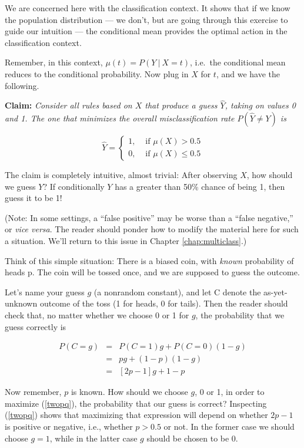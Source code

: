 We are concerned here with the classification context.  It shows that
if we know the population distribution --- we don't, but are going
through this exercise to guide our intuition --- the conditional mean
provides the optimal action in the classification context.

Remember, in this context, $\mu(t) = P(Y ~|~ X = t)$, i.e.\ the
conditional mean reduces to the conditional probability.  Now plug in
$X$ for $t$, and we have the following.

{\bf Claim:} {\it Consider all rules based on $X$ that produce a guess
$\widehat{Y}$, taking on values 0 and 1.  The one that minimizes the
overall misclassification rate $P(\widehat{Y} \neq Y)$ is}

\begin{equation}
\widehat{Y} = 
\begin{cases}
      1, & \textrm{ if } \mu(X) > 0.5 \\
      0, & \textrm{ if } \mu(X) \leq 0.5 
\end{cases}
\end{equation}

The claim is completely intuitive, almost trivial:  After observing $X$,
how should we guess $Y$?  If conditionally $Y$ has a greater than 50\%
chance of being 1, then guess it to be 1!

(Note:  In some settings, a ``false positive'' may be worse than a
``false negative,'' or {\it vice versa}.  The reader should ponder how
to modify the material here for such a situation.  We'll return to this
issue in Chapter \ref{chap:multiclass}.)

Think of this simple situation:  There is a biased coin, with
\textit{known} probability of heads p.  The coin will be tossed once,
and we are supposed to guess the outcome.

Let's name your guess $g$ (a nonrandom constant), and let C denote the
as-yet-unknown outcome of the toss (1 for heads, 0 for tails).  Then the
reader should check that, no matter whether we choose 0 or 1 for $g$,
the probability that we guess correctly is

\begin{eqnarray}
P(C = g) &=& P(C = 1) g + P(C = 0) (1-g) \\ 
&=& pg + (1-p)(1-g) \\
&=& [2 p - 1] g + 1 - p 
\label{twopq}
\end{eqnarray}

Now remember, $p$ is known.  How should we choose $g$, 0 or 1, in
order to maximize (\ref{twopq}), the probability that our guess is
correct?  Inspecting (\ref{twopq}) shows that maximizing that expression
will depend on whether $2p - 1$ is positive or negative, i.e., whether
$p > 0.5$ or not.  In the former case we should choose $g = 1$, while in
the latter case $g$ should be chosen to be 0.

